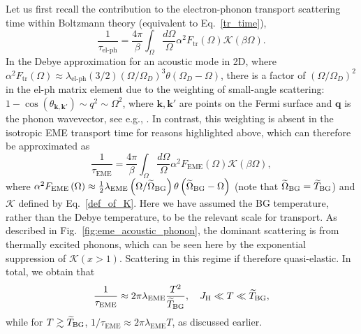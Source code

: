 \documentclass[aps,prl,twocolumn,superscriptaddress,amsmath,nofootinbib,10pt,floatfix]{revtex4-2}
\begin{document}
\begin{widetext}
 
Let us first recall the contribution to the electron-phonon transport scattering time \cite{Allen1993,sadovskii_diagrammatics_2019} within Boltzmann theory (equivalent to Eq.~\eqref{tr_time}), 
\begin{equation}
    \frac{1}{\tau_{\text{el-ph}}}=\frac{4\pi}{\beta}\int_{\Omega}\frac{d\Omega}{\Omega}\alpha^{2}F_{\text{tr}}\left(\Omega\right)\mathcal{K}\left(\beta\Omega\right).
\end{equation}
In the Debye approximation for an acoustic mode in 2D, where $\alpha^{2}F_{\text{tr}}\left(\Omega\right)\approx \lambda_{\text{el-ph}} (3/2)\left(\Omega/\Omega_{D}\right)^{3}\theta\left(\Omega_{D}-\Omega\right)$, there is a factor of $\left(\Omega/\Omega_{D}\right)^{2}$ in the el-ph matrix element due to the weighting of small-angle scattering: $1-\cos\left( \theta_{\boldsymbol{k},\boldsymbol{k'}}\right) \sim q^2 \sim \Omega^2$, where $\boldsymbol{k},\boldsymbol{k'}$ are points on the Fermi surface and $\boldsymbol{q}$ is the phonon wavevector, see e.g., \cite{Ziman_2001}. In contrast, this weighting is absent in the isotropic EME transport time for reasons highlighted above, which can therefore be approximated as 
\begin{equation}
    \frac{1}{\tau_{\text{EME}}}=\frac{4\pi}{\beta}\int_{\Omega}\frac{d\Omega}{\Omega}\alpha^{2}F_{\text{EME}}\left(\Omega\right)\mathcal{K}\left(\beta\Omega\right),
\end{equation}
where $\alpha^{2}F_{\text{\text{EME}}}\left(\Omega\right)\approx\frac{1}{2}\lambda_{\text{EME}}\left(\Omega/\widetilde{\Omega}_{\text{BG}}\right)\theta\left(\widetilde{\Omega}_{\text{BG}}-\Omega\right)$ (note that $\widetilde{\Omega}_{\rm BG} = \widetilde{T}_{\rm BG}$) and $\mathcal{K}$ defined by Eq.~\eqref{def_of_K}. Here we have assumed the BG temperature, rather than the Debye temperature, to be the relevant scale for transport. As described in Fig.~\ref{fig:eme_acoustic_phonon}, the dominant scattering is from thermally excited phonons, which can be seen here by the exponential suppression of $\mathcal{K}(x>1)$. Scattering in this regime if therefore quasi-elastic. In total, we obtain that
\begin{equation}
    \frac{1}{\tau_{\text{EME}}}\approx2\pi\lambda_{\text{EME}}\frac{T^{2}}{\widetilde{T}_{\text{BG}}}, \quad J_{\rm H} \ll T \ll \widetilde{T}_{\rm BG},
\end{equation}
while for $T\gtrsim \widetilde{T}_{\rm BG}$, $1/\tau_{\text{EME}}\approx2\pi\lambda_{\text{EME}}T$, as discussed earlier.


\end{widetext}
\end{document}

